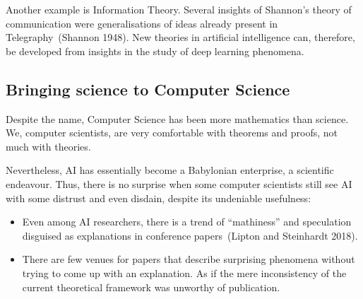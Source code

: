 \documentclass[
  letterpaper,
  12pt,
  british]{tufte-book}
\theoremstyle{plain}
\theoremstyle{definition}
\theoremstyle{plain}
\theoremstyle{remark}
\begin{document}
Another example is Information Theory. Several insights of Shannon's
theory of communication were generalisations of ideas already present in
Telegraphy~(Shannon
1948).
New theories in artificial intelligence can, therefore, be developed
from insights in the study of deep learning phenomena.

\hypertarget{sec-bringing_science}{%
\subsection{Bringing science to Computer
Science}\label{sec-bringing_science}}

Despite the name, Computer Science has been more mathematics than
science. We, computer scientists, are very comfortable with theorems and
proofs, not much with theories.

Nevertheless, {AI} has essentially become a Babylonian enterprise, a
scientific endeavour. Thus, there is no surprise when some computer
scientists still see AI with some distrust and even disdain, despite its
undeniable usefulness:

\begin{itemize}
\item
  Even among AI researchers, there is a trend of ``mathiness'' and
  speculation disguised as explanations in conference papers~(Lipton and
  Steinhardt
  2018).
\item
  There are few venues for papers that describe surprising phenomena
  without trying to come up with an explanation. As if the mere
  inconsistency of the current theoretical framework was unworthy of
  publication.
\end{itemize}
\end{document}
